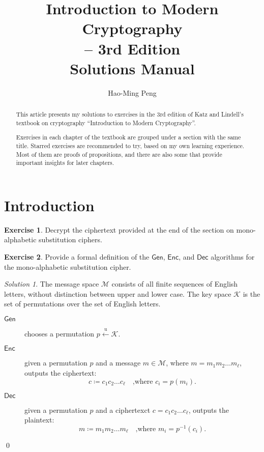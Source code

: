 \documentclass[titlepage,reqno]{amsart}
\title[Solutions to Katz-Lindell's Textbook]
{Introduction to Modern Cryptography \\ -- 3rd Edition \\ Solutions Manual}
\author{Hao-Ming Peng}
\theoremstyle{definition}
\newtheorem{exercise}{Exercise}[section]
\theoremstyle{remark}
\newtheorem*{solution}{Solution}
\newcommand{\assign}{\coloneq}
\newcommand{\ugets}{\overset{\text{u}}{\gets}}
\begin{document}
\begin{abstract}
    This article presents my solutions to exercises in the 3rd edition of Katz and Lindell's textbook
    on cryptography ``Introduction to Modern Cryptography''.

    Exercises in each chapter of the textbook are grouped under a section with the same title.
    Starred exercises are recommended to try, based on my own learning experience.
    Most of them are proofs of propositions, and there are also some that provide important 
    insights for later chapters.
\end{abstract}
\maketitle

\section{Introduction}
\begin{exercise}
    Decrypt the ciphertext provided at the end of the section on mono- alphabetic substitution ciphers.
\end{exercise}

\newcommand{\Gen}{\mathsf{Gen}}
\newcommand{\Enc}{\mathsf{Enc}}
\newcommand{\Dec}{\mathsf{Dec}}
\begin{exercise}
    Provide a formal definition of the $\Gen$, $\Enc$, and $\Dec$ algorithms for the mono-alphabetic substitution cipher.

    \begin{solution}
        The message space $\mathcal{M}$ consists of all finite sequences of English letters, without distinction between upper
        and lower case.
        The key space $\mathcal{K}$ is the set of permutations over the set of English letters.
        \begin{description}
            \item[$\Gen$] chooses a permutation $p\ugets\mathcal{K}$.
            \item[$\Enc$] given a permutation $p$ and a message $m \in \mathcal{M}$, where $m = m_1 m_2 \dots m_\ell$,
                outputs the ciphertext:
                \begin{equation*}
                    c \assign c_1 c_2 \dots c_\ell \quad \text{,where $c_i = p(m_i)$.}
                \end{equation*}
            \item[$\Dec$] given a permutation $p$ and a ciphertexct $c = c_1 c_2 \dots c_\ell$,
                outputs the plaintext:
                \begin{equation*}
                    m \assign m_1 m_2 \dots m_\ell \quad \text{,where $m_i = p^{-1}(c_i)$.}
                \end{equation*}
        \end{description}
        \qed
    \end{solution}
\end{exercise}
\end{document}
